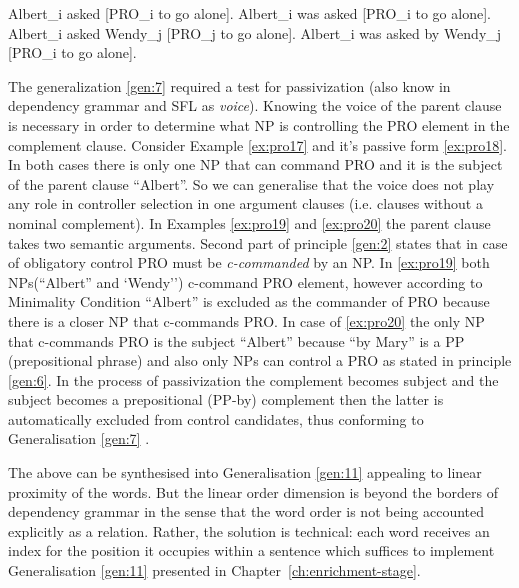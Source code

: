 \begin{exe}
	\ex\label{ex:pro17} Albert_i asked [PRO_i to go alone].
	\ex\label{ex:pro18} Albert_i was asked [PRO_i to go alone].
	\ex\label{ex:pro19} Albert_i asked Wendy_j [PRO_j to go alone].
	\ex\label{ex:pro20} Albert_i was asked by Wendy_j [PRO_i to go alone].
\end{exe}


The generalization \ref{gen:7} required a test for passivization (also know in dependency grammar and SFL as \textit{voice}). Knowing the voice of the parent clause is necessary in order to determine what NP is controlling the PRO element in the complement clause. Consider Example \ref{ex:pro17} and it's passive form \ref{ex:pro18}. In both cases there is only one NP that can command PRO and it is the subject of the parent clause ``Albert''. So we can generalise that the voice does not play any role in controller selection in one argument clauses (i.e. clauses without a nominal complement). In Examples \ref{ex:pro19} and \ref{ex:pro20} the parent clause takes two semantic arguments. Second part of principle \ref{gen:2} states that in case of obligatory control PRO must be \textit{c-commanded} by an NP. In \ref{ex:pro19} both NPs(``Albert'' and `Wendy'') c-command PRO element, however according to Minimality Condition\citep[479]{Haegeman1991} ``Albert'' is excluded as the commander of PRO because there is a closer NP that c-commands PRO. In case of \ref{ex:pro20} the only NP that c-commands PRO is the subject ``Albert'' because ``by Mary'' is a PP (prepositional phrase) and also only NPs can control a PRO as stated in principle \ref{gen:6}. In the process of passivization the complement becomes subject and the subject becomes a prepositional (PP-by) complement then the latter is automatically excluded from control candidates, thus conforming to Generalisation \ref{gen:7} \citep[281]{Haegeman1991}. 

The above can be synthesised into Generalisation \ref{gen:11} appealing to linear proximity of the words. But the linear order dimension is beyond the borders of dependency grammar in the sense that the word order is not being accounted explicitly as a relation. Rather, the solution is technical: each word receives an index for the position it occupies within a sentence which suffices to implement Generalisation \ref{gen:11} presented in \mbox{Chapter \ref{ch:enrichment-stage}}.

